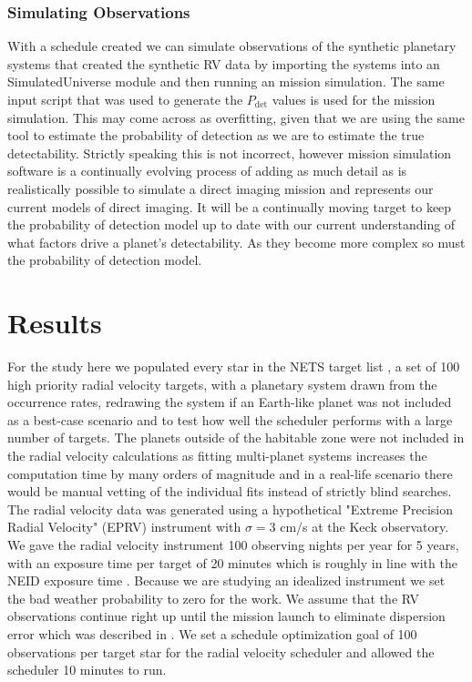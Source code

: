 \subsubsection{Simulating Observations}

With a schedule created we can simulate observations of the synthetic planetary
systems that created the synthetic RV data by importing the systems into an
 SimulatedUniverse module and then running an 
mission simulation. The same  input script that was used to
generate the $P_\textrm{det}$ values is used for the mission simulation. This
may come across as overfitting, given that we are using the same tool to
estimate the probability of detection as we are to estimate the true
detectability. Strictly speaking this is not incorrect, however mission
simulation software is a continually evolving process of adding as much detail
as is realistically possible to simulate a direct imaging mission and
represents our current models of direct imaging. It will be a continually
moving target to keep the probability of detection model up to date with our
current understanding of what factors drive a planet's detectability. As they
become more complex so must the probability of detection model.

\section{Results}

For the study here we populated every star in the NETS target list
\citep{guptaTargetPrioritization2021}, a set of 100 high priority radial
velocity targets, with a planetary system drawn from the
\citet{dulzJointRadialVelocity2020} occurrence rates, redrawing the system if
an Earth-like planet was not included as a best-case scenario and to test how
well the scheduler performs with a large number of targets. The planets outside
of the habitable zone were not included in the radial velocity calculations as
fitting multi-planet systems increases the computation time by many orders of
magnitude and in a real-life scenario there would be manual vetting of the
individual fits instead of strictly blind searches. The radial velocity data
was generated using a hypothetical "Extreme Precision Radial Velocity" (EPRV)
instrument with $\sigma = 3$ cm/s at the Keck observatory. We gave the radial
velocity instrument 100 observing nights per year for 5 years, with an exposure
time per target of 20 minutes which is roughly in line with the NEID exposure
time \citep{guptaTargetPrioritization2021}. Because we are studying an
idealized instrument we set the bad weather probability to zero for the work.
We assume that the RV observations continue right up until the mission launch
to eliminate dispersion error which was described in . We
set a schedule optimization goal of 100 observations per target star for the
radial velocity scheduler and allowed the scheduler 10 minutes to run.

